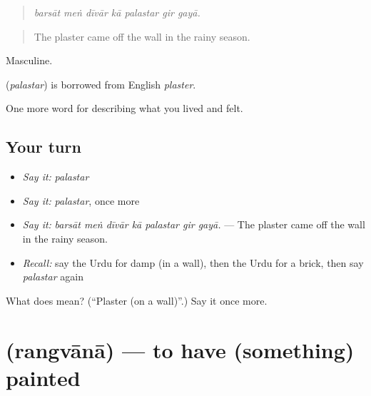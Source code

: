 \begin{quote}
      
\end{quote}

\begin{quote}
\emph{barsāt meṅ dīvār kā palastar gir gayā.}
\end{quote}

\begin{quote}
The plaster came off the wall in the rainy season.
\end{quote}

Masculine.

\begin{cousinweb}
\textbf{} (\emph{palastar}) is borrowed from English \emph{plaster}.
\end{cousinweb}

\begin{grammarlens}[title={What you've built}]
One more word for describing what you lived and felt.
\end{grammarlens}

\subsection*{Your turn}
\begin{itemize}
\raggedright
  \item \emph{Say it:} \emph{palastar}
  \item \emph{Say it:} \emph{palastar}, once more
  \item \emph{Say it:} \emph{barsāt meṅ dīvār kā palastar gir gayā.} — The plaster came off the wall in the rainy season.
  \item \emph{Recall:} say the Urdu for damp (in a wall), then the Urdu for a brick, then say \emph{palastar} again
\end{itemize}

\begin{tcolorbox}[breakable,colback=teal!4,colframe=teal!35!black,title={Before you move on}]
What does  mean? (\textquotedblleft{}Plaster (on a wall)\textquotedblright{}.) Say it once more.
\end{tcolorbox}
\section[\texorpdfstring{\ur{رنگوانا} (rangvānā)}{رنگوانا (rangvānā)}]{ (rangvānā) — to have (something) painted}

\label{lesson:UR-C503-rangvana}



